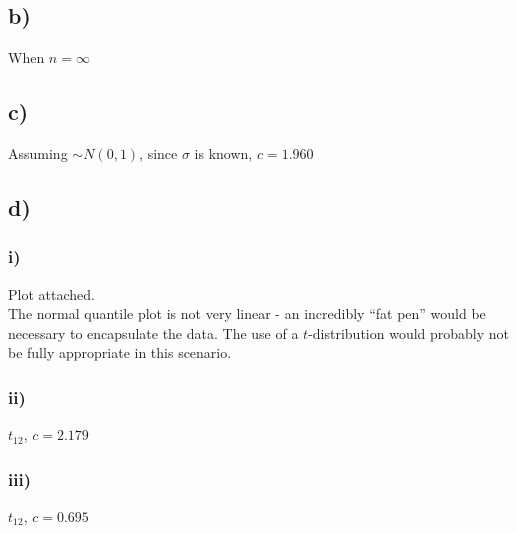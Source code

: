 \documentclass[]{article}
\begin{document}
\subsection{b)}
When $n = \infty$

\subsection{c)}
Assuming $\sim N(0,1)$, since $\sigma$ is known, $c=1.960$

\subsection{d)}
\subsubsection{i)}
Plot attached.
\\
The normal quantile plot is not very linear - an incredibly ``fat pen'' would be necessary to encapsulate the data. The use of a $t$-distribution would probably not be fully appropriate in this scenario.
\subsubsection{ii)}
$t_{12}$, $c = 2.179$
\subsubsection{iii)}
$t_{12}$, $c = 0.695$
\end{document}
